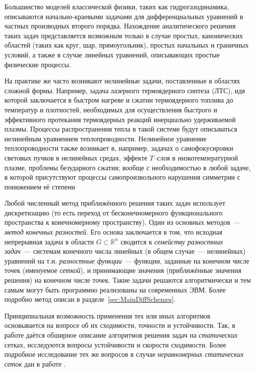 Большинство моделей классической физики, таких как гидрогазодинамика, описываются начально-краевыми задачами для дифференциальных уравнений в частных производных второго порядка\cite{ТихоновСамарский, ЛандауГидродинамика}.
Нахождение аналитического решения таких задач представляется возможным только в случае простых, канонических областей (таких как круг, шар, прямоугольник), простых начальных и граничных условий, а также в случае линейных уравнений, описывающих простые физические процессы.

На практике же часто возникают нелинейные задачи, поставленные в областях сложной формы.
Например, задача лазерного термоядерного синтеза (ЛТС), идя которой заключается в быстром нагреве и сжатии термоядерного топлива до температур и плотностей, необходимых для осуществления быстрого и эффективного протекания термоядерных реакций инерциально удерживаемой плазмы.
Процессы распространения тепла в такой системе будут описываться нелинейным уравнением теплопроводности.
Нелинейное уравнение теплопроводности также возникает в, например, задачах о самофокусировки световых пучков в нелинейных средах, эффекте $T$--слоя в низкотемпературной плазме, проблемы безударного сжатия; вообще с необходимостью в любой задаче, в которой присутствуют процессы самопроизвольного нарушения симметрии с понижением её степени \cite{ГалактионовКвазилинейное} 

Любой численный метод приближённого решения таких задач использует дискретизацию (то есть переход от бесконечномерного функционального пространства к конечномерному пространству).
Один из основных методов~--- \emph{метод конечных разностей}.
Его основа заключается в том, что исходная непрерывная задача в области $G \subset \mathbb{R}^n$ сводится к \emph{семейству разностных задач}~--- системам конечного числа линейных (в общем случае~--- нелинейных) уравнений на т.н. \emph{разностные функции}~--- функции, заданные на конечном числе точек (именуемое \emph{сеткой}), и принимающие значения (приближённые значения решения) на конечном числе точек.
Такие задачи решаются алгоритмически и тем самым могут быть программно реализованы на современных ЭВМ.
Более подробно метод описан в разделе~\ref{sec:MainDiffSchemes}.

Принципиальная возможность применения тех или иных алгоритмов основывается на вопросе об их сходимости, точности и устойчивости.
Так, в работе \cite{СамарскийТеорияРазностныхСхем} даётся обширное описание алгоритмов решения задач на \emph{статических} сетках, исследуются вопросы устойчивости и скорости сходимости.
Более подробное исследование тех же вопросов в случае \emph{неравномерных статических сеток} дан в работе \cite{СамарскийНеравномерныеСетки}.

